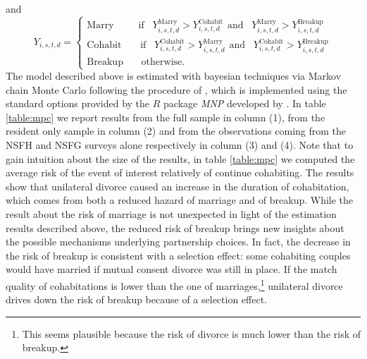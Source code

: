 \documentclass[12pt]{article}
\numberwithin{table}{section}
\begin{document}
and
\begin{equation}\label{eq:probit_outcome}
Y_{i,s,t,d}=
\begin{cases}  	
\text{Marry}\hspace{30pt}       \text{if}\hspace{10pt}Y_{i,s,t,d}^\text{Marry}>Y_{i,s,t,d}^\text{Cohabit}\hspace{5pt}\text{and}\hspace{5pt}\hspace{5pt}Y_{i,s,t,d}^\text{Marry}>Y_{i,s,t,d}^\text{Breakup}\\
\text{Cohabit}\hspace{23pt}   \text{if}\hspace{10pt}Y_{i,s,t,d}^\text{Cohabit}>Y_{i,s,t,d}^\text{Marry}\hspace{5pt}\text{and}\hspace{5pt}\hspace{5pt}Y_{i,s,t,d}^\text{Cohabit}>Y_{i,s,t,d}^\text{Breakup}\\
\text{Breakup}\hspace{22pt}     \text{otherwise.}
\end{cases}
\end{equation}
The model described above is estimated with bayesian techniques via Markov chain Monte Carlo following the procedure of \cite{imai2005a}, which is implemented using the standard options provided by the $R$ package \textit{MNP} developed by \cite{imai2005b}. In table \ref{table:mpc} we report results from the full sample in column (1), from the resident only sample in column (2) and from the observations coming from the NSFH and NSFG surveys alone respectively in column (3) and (4). Note that to gain intuition about the size of the results, in  table \ref{table:mpc} we computed the average risk of the event of interest relatively of continue cohabiting. The results show that unilateral divorce caused an increase in the duration of cohabitation, which comes from both a reduced hazard of marriage and of breakup. While the result about the risk of marriage is not unexpected in light of the estimation results described above, the reduced risk of breakup brings new insights about the possible mechanisms underlying partnership choices. In fact, the decrease in the risk of breakup is consistent with a selection effect: some cohabiting couples would have married if mutual consent divorce was still in place. If the match quality of cohabitations is lower than the one of marriages,\footnote{This seems plausible because the risk of divorce is much lower than the risk of breakup.} unilateral divorce drives down the risk of breakup because of a selection effect. 
\end{document}
